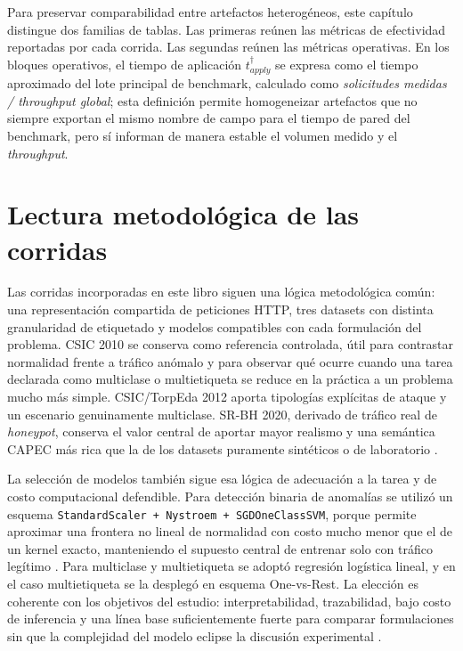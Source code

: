 \documentclass[12pt,oneside]{report}
\begin{document}
Para preservar comparabilidad entre artefactos heterogéneos, este capítulo distingue dos familias de tablas. Las primeras reúnen las métricas de efectividad reportadas por cada corrida. Las segundas reúnen las métricas operativas. En los bloques operativos, el tiempo de aplicación $t_{apply}^{\dagger}$ se expresa como el tiempo aproximado del lote principal de benchmark, calculado como \emph{solicitudes medidas / throughput global}; esta definición permite homogeneizar artefactos que no siempre exportan el mismo nombre de campo para el tiempo de pared del benchmark, pero sí informan de manera estable el volumen medido y el \textit{throughput}.\

\section{Lectura metodológica de las corridas}
Las corridas incorporadas en este libro siguen una lógica metodológica común: una representación compartida de peticiones HTTP, tres datasets con distinta granularidad de etiquetado y modelos compatibles con cada formulación del problema. CSIC 2010 se conserva como referencia controlada, útil para contrastar normalidad frente a tráfico anómalo y para observar qué ocurre cuando una tarea declarada como multiclase o multietiqueta se reduce en la práctica a un problema mucho más simple. CSIC/TorpEda 2012 aporta tipologías explícitas de ataque y un escenario genuinamente multiclase. SR-BH 2020, derivado de tráfico real de \textit{honeypot}, conserva el valor central de aportar mayor realismo y una semántica CAPEC más rica que la de los datasets puramente sintéticos o de laboratorio \cite{srbh_dataverse,srbh_paper,csic2010_impact,csic2010_doc,torpeda_2012}.\

La selección de modelos también sigue esa lógica de adecuación a la tarea y de costo computacional defendible. Para detección binaria de anomalías se utilizó un esquema \texttt{StandardScaler + Nystroem + SGDOneClassSVM}, porque permite aproximar una frontera no lineal de normalidad con costo mucho menor que el de un kernel exacto, manteniendo el supuesto central de entrenar solo con tráfico legítimo \cite{scholkopf2001,williams2001,sklearn_sgd_ocsvm,sklearn_kernel_approx}. Para multiclase y multietiqueta se adoptó regresión logística lineal, y en el caso multietiqueta se la desplegó en esquema One-vs-Rest. La elección es coherente con los objetivos del estudio: interpretabilidad, trazabilidad, bajo costo de inferencia y una línea base suficientemente fuerte para comparar formulaciones sin que la complejidad del modelo eclipse la discusión experimental \cite{islr_logreg,sklearn_logreg,rifkin_ova,tsoumakas_multilabel_overview}.\
\end{document}

